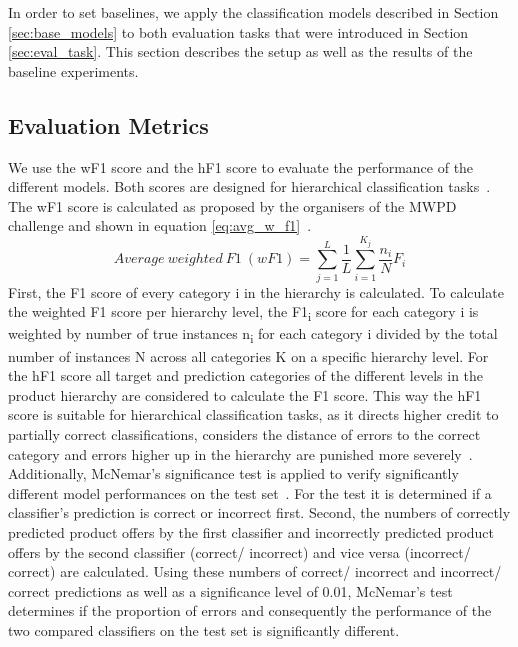 \documentclass[11pt,dvipdfm]{article}
\begin{document}
In order to set baselines, we apply the classification models described in Section \ref{sec:base_models} to both evaluation tasks that were introduced in Section \ref{sec:eval_task}. This section describes the setup as well as the results of the baseline experiments.

\subsection{Evaluation Metrics}

We use the \ac{wF1} score and the \ac{hF1} score to evaluate the performance of the different models.
Both scores are designed for hierarchical classification tasks~\cite{zhang_mwpd2020_2020, kiritchenko_functional_2005}.
The \ac{wF1} score is calculated as proposed by the organisers of the \ac{MWPD} challenge and shown in equation \ref{eq:avg_w_f1}~\cite{zhang_mwpd2020_2020}.
\begin{equation}
  Average\ weighted\ F1\ (wF1) = \sum_{j=1}^{L} \frac{1}{L} \sum_{i=1}^{K_j} \frac{n_i}{N} F_i
  \label{eq:avg_w_f1}
\end{equation}
First, the F1 score of every category i in the hierarchy is calculated.
To calculate the weighted F1 score per hierarchy level, the F1\textsubscript{i} score for each category i is weighted by number of true instances n\textsubscript{i} for each category i divided by the total number of instances N across all categories K on a specific hierarchy level.
For the \ac{hF1} score all target and prediction categories of the different levels in the product hierarchy are considered to calculate the F1 score.
This way the \ac{hF1} score is suitable for hierarchical classification tasks, as it directs higher credit to partially correct classifications, considers the distance of errors to the correct category and errors higher up in the hierarchy are punished more severely~\cite{kiritchenko_functional_2005}.
Additionally, McNemar's significance test is applied to verify significantly different model performances on the test set~\cite{dietterich_approximate_1998}.
For the test it is determined if a classifier's prediction is correct or incorrect first.
Second, the numbers of correctly predicted product offers by the first classifier and incorrectly predicted product offers by the second classifier (correct/ incorrect) and vice versa (incorrect/ correct) are calculated.
Using these numbers of correct/ incorrect and incorrect/ correct predictions as well as a significance level of 0.01, McNemar's test determines if the proportion of errors and consequently the performance of the two compared classifiers on the test set is significantly different.
\end{document}
